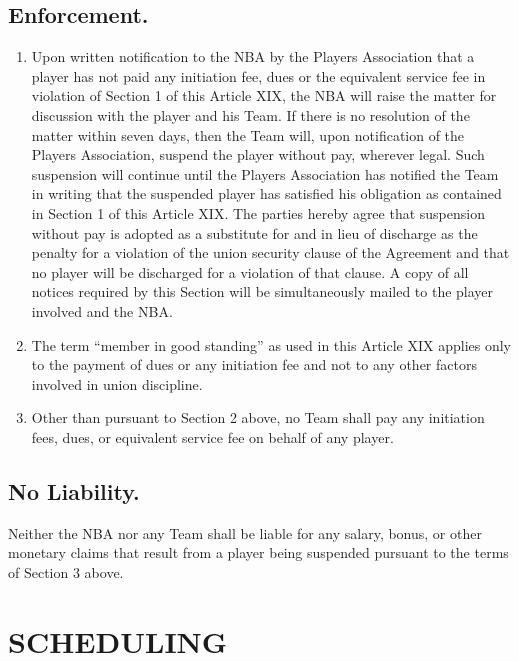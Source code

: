 \documentclass[
]{book}
\providecommand{\tightlist}{%
  \setlength{\itemsep}{0pt}\setlength{\parskip}{0pt}}
\begin{document}
\hypertarget{enforcement.}{%
\section{Enforcement.}\label{enforcement.}}

\begin{enumerate}
\def\labelenumi{(\alph{enumi})}
\tightlist
\item
  Upon written notification to the NBA by the Players Association that a player has not paid any initiation fee, dues or the equivalent service fee in violation of Section 1 of this Article XIX, the NBA will raise the matter for discussion with the player and his Team. If there is no resolution of the matter within seven days, then the Team will, upon notification of the Players Association, suspend the player without pay, wherever legal. Such suspension will continue until the Players Association has notified the Team in writing that the suspended player has satisfied his obligation as contained in Section 1 of this Article XIX. The parties hereby agree that suspension without pay is adopted as a substitute for and in lieu of discharge as the penalty for a violation of the union security clause of the Agreement and that no player will be discharged for a violation of that clause. A copy of all notices required by this Section will be simultaneously mailed to the player involved and the
  NBA.
\item
  The term ``member in good standing'' as used in this Article XIX applies only to the payment of dues or any initiation fee and not to any other factors involved in union discipline.
\item
  Other than pursuant to Section 2 above, no Team shall pay any initiation fees, dues, or equivalent service fee on behalf of any player.
\end{enumerate}

\hypertarget{no-liability.}{%
\section{No Liability.}\label{no-liability.}}

Neither the NBA nor any Team shall be liable for any salary, bonus, or other monetary claims that result from a player being suspended pursuant to the terms of Section 3 above.

\hypertarget{scheduling}{%
\chapter{SCHEDULING}\label{scheduling}}
\end{document}
